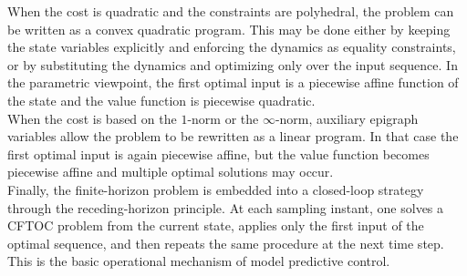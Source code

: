 When the cost is quadratic and the constraints are polyhedral, the problem can be written as a
convex quadratic program. This may be done either by keeping the state variables explicitly and
enforcing the dynamics as equality constraints, or by substituting the dynamics and optimizing
only over the input sequence. In the parametric viewpoint, the first optimal input is a piecewise
affine function of the state and the value function is piecewise quadratic.\\

When the cost is based on the \(1\)-norm or the \(\infty\)-norm, auxiliary epigraph variables allow
the problem to be rewritten as a linear program. In that case the first optimal input is again
piecewise affine, but the value function becomes piecewise affine and multiple optimal solutions
may occur.\\

Finally, the finite-horizon problem is embedded into a closed-loop strategy through the
receding-horizon principle. At each sampling instant, one solves a CFTOC problem from the
current state, applies only the first input of the optimal sequence, and then repeats the same
procedure at the next time step. This is the basic operational mechanism of model predictive
control.